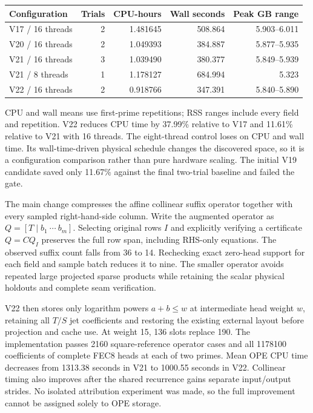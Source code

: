 \documentclass[11pt]{article}
\begin{document}
\begin{center}
\begin{tabular}{lrrrr}\toprule
Configuration & Trials & CPU-hours & Wall seconds & Peak GB range\\\midrule
V17 / 16 threads & 2 & 1.481645 & 508.864 & 5.903--6.011\\
V20 / 16 threads & 2 & 1.049393 & 384.887 & 5.877--5.935\\
V21 / 16 threads & 3 & 1.039490 & 380.377 & 5.849--5.939\\
V21 / 8 threads & 1 & 1.178127 & 684.994 & 5.323\\
V22 / 16 threads & 2 & 0.918766 & 347.391 & 5.840--5.890\\
\bottomrule
\end{tabular}
\end{center}
CPU and wall means use first-prime repetitions; RSS ranges include every
field and repetition. V22 reduces CPU time by 37.99\% relative to V17 and
11.61\% relative to V21 with 16 threads. The eight-thread control loses on
CPU and wall time. Its wall-time-driven physical schedule changes the
discovered space, so it is a configuration comparison rather than pure
hardware scaling. The initial V19 candidate saved only 11.67\% against the
final two-trial baseline and failed the gate.

The main change compresses the affine collinear suffix operator together
with every sampled right-hand-side column. Write the augmented operator as
$Q=[T\mid b_1\ \cdots\ b_m]$. Selecting original rows $I$ and explicitly
verifying a certificate $Q=CQ_I$ preserves the full row span, including
RHS-only equations. The observed suffix count falls from 36 to 14. Rechecking
exact zero-head support for each field and sample batch reduces it to nine.
The smaller operator avoids repeated large projected sparse products while
retaining the scalar physical holdouts and complete seam verification.

V22 then stores only logarithm powers $a+b\leq w$ at intermediate head
weight $w$, retaining all $T/S$ jet coefficients and restoring the existing
external layout before projection and cache use. At weight 15, 136 slots
replace 190. The implementation passes 2160 square-reference operator cases
and all 1178100 coefficients of complete FEC8 heads at each of two primes.
Mean OPE CPU time decreases from 1313.38 seconds in V21 to 1000.55 seconds
in V22. Collinear timing also improves after the shared recurrence gains
separate input/output strides. No isolated attribution experiment was made,
so the full improvement cannot be assigned solely to OPE storage.
\end{document}
